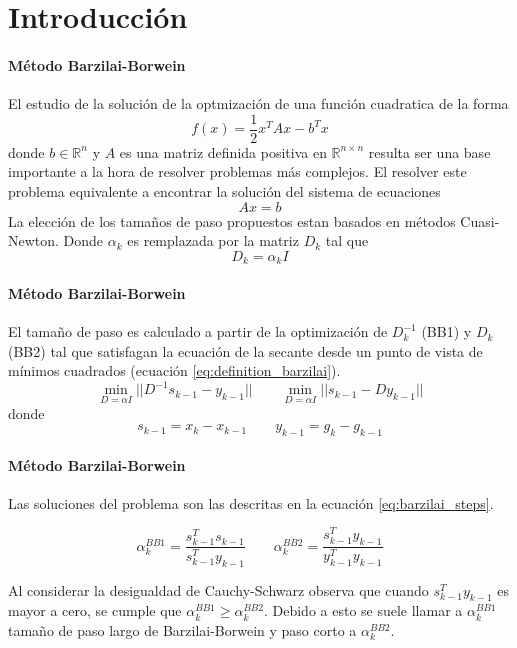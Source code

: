 \titleframe

\section{Introducción}

\begin{frame}{\insertsectionhead}
    \framesubtitle{Método Barzilai-Borwein}
    El estudio de la solución de la optmización de una función cuadratica de la forma
    \begin{equation}
        f(x) = \frac{1}{2}x^TAx- b^Tx \label{eq:quadratic_function}
    \end{equation}
    donde $b\in\mathbb{R}^n$ y $A$ es una matriz definida positiva en $\mathbb{R}^{n\times n}$ resulta ser una base importante a la hora de resolver problemas más complejos. El resolver este problema equivalente a encontrar la solución del sistema de ecuaciones
    \begin{equation*}
        Ax=b
    \end{equation*}
    La elección de los tamaños de paso propuestos estan basados en métodos Cuasi-Newton. Donde $\alpha_k$ es remplazada por la matriz $D_k$ tal que
    \begin{equation}
        D_k = \alpha_k \mathit{I}
    \end{equation}
\end{frame}

\begin{frame}{\insertsectionhead}
    \framesubtitle{Método Barzilai-Borwein}
    El tamaño de paso es calculado a partir de la optimización de $D_k^{-1}$  (BB1) y  $D_k$ (BB2) tal que satisfagan la ecuación de la secante desde un punto de vista de mínimos cuadrados (ecuación \ref{eq:definition_barzilai}).
    \begin{equation}
        \min_{D=\alpha \mathit{I}} ||D^{-1}s_{k-1}-y_{k-1}|| \qquad \min_{D=\alpha \mathit{I}} ||s_{k-1}-Dy_{k-1}|| \label{eq:definition_barzilai}
    \end{equation}
    donde
    \begin{equation*}
        s_{k-1} = x_k - x_{k-1} \qquad y_{k-1} = g_k - g_{k-1}
    \end{equation*}
\end{frame}

\begin{frame}{\insertsectionhead}
    \framesubtitle{Método Barzilai-Borwein}

    Las soluciones del problema son las descritas en la ecuación \ref{eq:barzilai_steps}.

    \begin{equation}
        \alpha^{BB1}_k = \frac{s^T_{k-1}s_{k-1}}{s^T_{k-1}y_{k-1}} \qquad \alpha_k^{BB2} = \frac{s_{k-1}^Ty_{k-1}}{y_{k-1}^Ty_{k-1}} \label{eq:barzilai_steps}
    \end{equation}

    Al considerar la desigualdad de Cauchy-Schwarz observa que cuando $s_{k-1}^Ty_{k-1}$ es mayor a cero, se cumple que $\alpha_k^{BB1} \geq \alpha_k^{BB2}$. Debido a esto se suele llamar a $\alpha_k^{BB1}$ tamaño de paso largo de Barzilai-Borwein y paso corto a $\alpha_k^{BB2}$.
\end{frame}